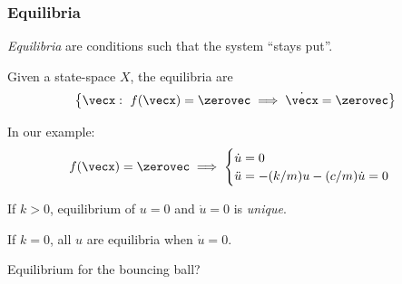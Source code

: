 \documentclass[12pt]{beamer}
\begin{document}
\begin{frame}
\frametitle{Equilibria}

\begin{itemize}

\vitem \emph{Equilibria} are conditions such that the system ``stays put''.

\vitem Given a state-space $X$, the equilibria are 
\[
\left\{
	\vecx : \ f(\vecx) = \zerovec \implies \dot \vecx = \zerovec
\right\}
\]

\vitem In our example:
\[
f(\vecx) = \zerovec \implies
\begin{cases}
	\dot u = 0	\\
	\ddot u = -(k/m) u - (c/m) \dot u = 0
\end{cases}
\]

\vitem If $k > 0$, equilibrium of $u = 0$ and $\dot u = 0$ is \emph{unique}.

\vitem If $k = 0$, all $u$ are equilibria when $\dot u = 0$.

\end{itemize}

\end{frame}



\begin{frame}
Equilibrium for the bouncing ball?
\end{frame}
\end{document}

